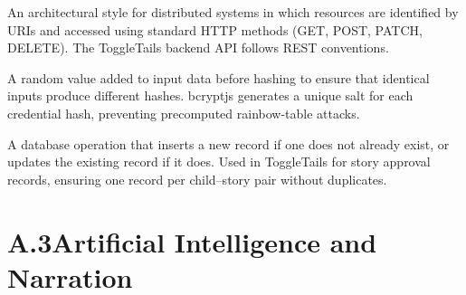 \begin{description}[leftmargin=2.5cm, style=nextline]
\item[\textbf{REST (Representational State Transfer)}]
An architectural style for distributed systems in which resources are
identified by URIs and accessed using standard HTTP methods (GET, POST, PATCH,
DELETE). The ToggleTails backend API follows REST conventions.

\item[\textbf{Salt (Cryptographic)}]
A random value added to input data before hashing to ensure that identical
inputs produce different hashes. bcryptjs generates a unique salt for each
credential hash, preventing precomputed rainbow-table attacks.

\item[\textbf{Upsert}]
A database operation that inserts a new record if one does not already exist,
or updates the existing record if it does. Used in ToggleTails for story
approval records, ensuring one record per child--story pair without
duplicates.

\end{description}

\section*{A.3\quad Artificial Intelligence and Narration}


